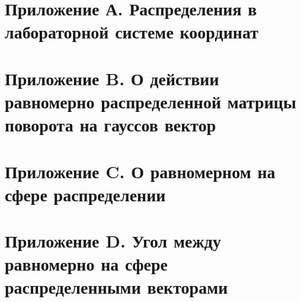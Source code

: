 \documentclass[12pt]{article}
\begin{document}
\begin{appendices}

\section{Приложение А. Распределения в лабораторной системе координат} \label{app1}



\section{Приложение B. О действии равномерно распределенной матрицы поворота на гауссов вектор} \label{app2}



\section{Приложение C. О равномерном на сфере распределении} \label{app3}



\section{Приложение D. Угол между равномерно на сфере распределенными векторами} \label{app4}



\end{appendices}
\end{document}

